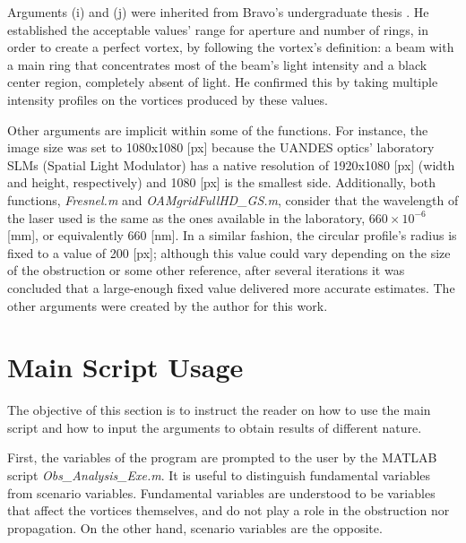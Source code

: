 Arguments (i) and (j) were inherited from Bravo's undergraduate thesis \cite{Thesis_Herbert:2020}. He established the acceptable values' range for aperture and number of rings, in order to create a perfect vortex, by following the vortex's definition: a beam with a main ring that concentrates most of the beam's light intensity and a black center region, completely absent of light. He confirmed this by taking multiple intensity profiles on the vortices produced by these values.

Other arguments are implicit within some of the functions. For instance, the image size was set to 1080x1080 [px] because the UANDES optics' laboratory SLMs (Spatial Light Modulator) has a native resolution of 1920x1080 [px] (width and height, respectively) and 1080 [px] is the smallest side. Additionally, both functions, \textit{Fresnel.m} and \textit{OAMgridFullHD\_GS.m}, consider that the wavelength of the laser used is the same as the ones available in the laboratory, $660 \times 10^{-6}$ [mm], or equivalently 660 [nm]. In a similar fashion, the circular profile's radius is fixed to a value of 200 [px]; although this value could vary depending on the size of the obstruction or some other reference, after several iterations it was concluded that a large-enough fixed value delivered more accurate estimates. The other arguments were created by the author for this work.

\section{Main Script Usage}

The objective of this section is to instruct the reader on how to use the main script and how to input the arguments to obtain results of different nature.

First, the variables of the program are prompted to the user by the MATLAB script \textit{Obs\_Analysis\_Exe.m}. It is useful to distinguish fundamental variables from scenario variables. Fundamental variables are understood to be variables that affect the vortices themselves, and do not play a role in the obstruction nor propagation. On the other hand, scenario variables are the opposite.

